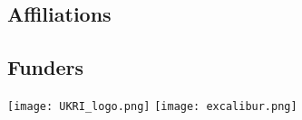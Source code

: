\documentclass[
]{ImperialPoster}
\begin{document}
\begin{multicols}{3}
\AtNextBibliography{\small}
\printbibliography
        
\subsection{Affiliations}

	
\subsection{Funders}

\texttt{[image: UKRI\_logo.png]} %
\texttt{[image: excalibur.png]} %
	

\end{multicols}

\end{document}
